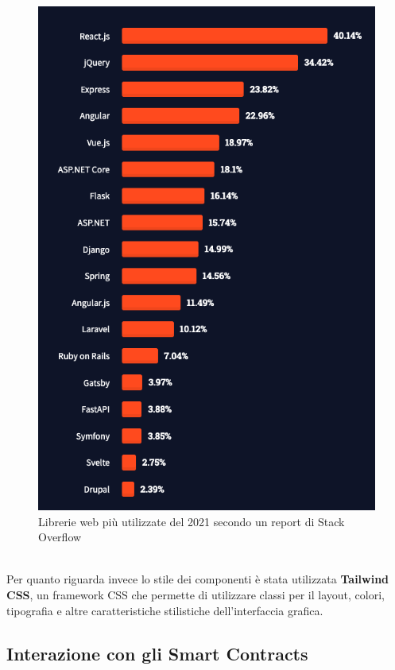 \documentclass[12pt,a4paper]{report}
\begin{document}
\begin{figure}[H]
  \includegraphics[scale=0.45]{react.png}
  \centering
  \caption{Librerie web più utilizzate del 2021 secondo un report di Stack Overflow}
  \label{fig:react}
\end{figure}


\noindent\\Per quanto riguarda invece lo stile dei componenti è stata utilizzata \textbf{Tailwind CSS}\cite{tailwind}, un framework CSS che permette di utilizzare classi per il layout, colori, tipografia e altre caratteristiche stilistiche dell'interfaccia grafica.

\subsection{Interazione con gli Smart Contracts}
\end{document}
